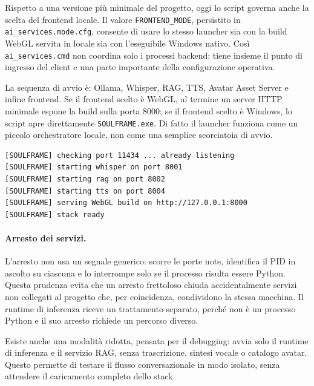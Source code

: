 Rispetto a una versione più minimale del progetto, oggi lo script governa anche la scelta del frontend locale. Il valore \texttt{FRONTEND\_MODE}, persistito in \texttt{ai\_services.mode.cfg}, consente di usare lo stesso launcher sia con la build WebGL servita in locale sia con l'eseguibile Windows nativo. Così \texttt{ai\_services.cmd} non coordina solo i processi backend: tiene insieme il punto di ingresso del client e una parte importante della configurazione operativa.

La sequenza di avvio è: Ollama, Whisper, RAG, TTS, Avatar Asset Server e infine frontend. Se il frontend scelto è WebGL, al termine un server HTTP minimale espone la build sulla porta 8000; se il frontend scelto è Windows, lo script apre direttamente \texttt{SOULFRAME.exe}. Di fatto il launcher funziona come un piccolo orchestratore locale, non come una semplice scorciatoia di avvio.

\begin{lstlisting}[style=sfterminal,title={Terminale Windows - console mode},caption={Esempio sintetico di avvio locale con \texttt{ai\_services.cmd}.}]
[SOULFRAME] checking port 11434 ... already listening
[SOULFRAME] starting whisper on port 8001
[SOULFRAME] starting rag on port 8002
[SOULFRAME] starting tts on port 8004
[SOULFRAME] serving WebGL build on http://127.0.0.1:8000
[SOULFRAME] stack ready
\end{lstlisting}

\paragraph{Arresto dei servizi.}
L'arresto non usa un segnale generico: scorre le porte note, identifica il PID in ascolto su ciascuna e lo interrompe solo se il processo risulta essere Python. Questa prudenza evita che un arresto frettoloso chiuda accidentalmente servizi non collegati al progetto che, per coincidenza, condividono la stessa macchina. Il runtime di inferenza riceve un trattamento separato, perché non è un processo Python e il suo arresto richiede un percorso diverso.

Esiste anche una modalità ridotta, pensata per il debugging: avvia solo il runtime di inferenza e il servizio RAG, senza trascrizione, sintesi vocale o catalogo avatar. Questo permette di testare il flusso conversazionale in modo isolato, senza attendere il caricamento completo dello stack.

